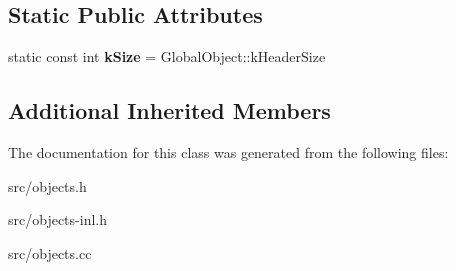 \subsection*{Static Public Attributes}
\begin{DoxyCompactItemize}
\item 
\hypertarget{classv8_1_1internal_1_1_j_s_global_object_a5dcb192b8930d640333fe390b2d5cfb8}{}static const int {\bfseries k\+Size} = Global\+Object\+::k\+Header\+Size\label{classv8_1_1internal_1_1_j_s_global_object_a5dcb192b8930d640333fe390b2d5cfb8}

\end{DoxyCompactItemize}
\subsection*{Additional Inherited Members}


The documentation for this class was generated from the following files\+:\begin{DoxyCompactItemize}
\item 
src/objects.\+h\item 
src/objects-\/inl.\+h\item 
src/objects.\+cc\end{DoxyCompactItemize}
